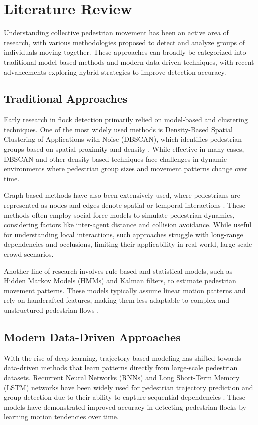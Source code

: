 \section{Literature Review}
Understanding collective pedestrian movement has been an active area of research, with various methodologies proposed to detect and analyze groups of individuals moving together. These approaches can broadly be categorized into traditional model-based methods and modern data-driven techniques, with recent advancements exploring hybrid strategies to improve detection accuracy.

\subsection{Traditional Approaches}

Early research in flock detection primarily relied on model-based and clustering techniques. One of the most widely used methods is Density-Based Spatial Clustering of Applications with Noise (DBSCAN), which identifies pedestrian groups based on spatial proximity and density \cite{ester1996density}. While effective in many cases, DBSCAN and other density-based techniques face challenges in dynamic environments where pedestrian group sizes and movement patterns change over time.

Graph-based methods have also been extensively used, where pedestrians are represented as nodes and edges denote spatial or temporal interactions \cite{helbing2000social}. These methods often employ social force models to simulate pedestrian dynamics, considering factors like inter-agent distance and collision avoidance. While useful for understanding local interactions, such approaches struggle with long-range dependencies and occlusions, limiting their applicability in real-world, large-scale crowd scenarios.

Another line of research involves rule-based and statistical models, such as Hidden Markov Models (HMMs) and Kalman filters, to estimate pedestrian movement patterns. These models typically assume linear motion patterns and rely on handcrafted features, making them less adaptable to complex and unstructured pedestrian flows \cite{li2008learning}. 

\subsection{Modern Data-Driven Approaches}

With the rise of deep learning, trajectory-based modeling has shifted towards data-driven methods that learn patterns directly from large-scale pedestrian datasets. Recurrent Neural Networks (RNNs) and Long Short-Term Memory (LSTM) networks have been widely used for pedestrian trajectory prediction and group detection due to their ability to capture sequential dependencies \cite{zhang2016deep}. These models have demonstrated improved accuracy in detecting pedestrian flocks by learning motion tendencies over time.

